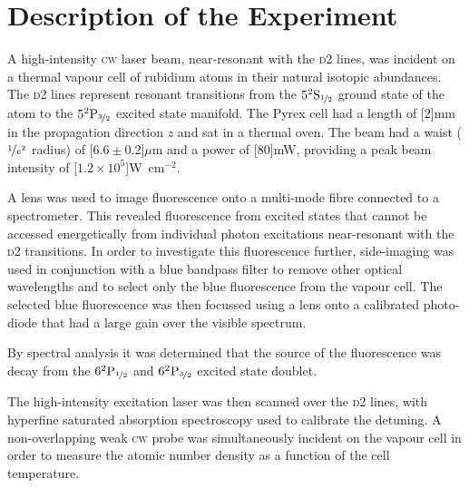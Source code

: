 \section{Description of the Experiment}
  \label{sec:twophoton_experiment}

    A high-intensity \textsc{cw} laser beam, near-resonant with the \textsc{d2}
    lines, was incident on a thermal vapour cell of rubidium atoms in their
    natural isotopic abundances. The \textsc{d2} lines represent resonant
    transitions from the $5^2\rm{S}_{\nicefrac{1}{2}}$ ground state of the
    atom to the $5^2\rm{P}_{\nicefrac{3}{2}}$ excited state manifold. The
    Pyrex cell had a length of \unit[$2$]{mm} in the propagation direction $z$
    and sat in a thermal oven. The beam had a waist (\ie $\nicefrac{1}{e^2}$
    radius) of \unit[$6.6\pm0.2$]{$\mu$m} and a power of \unit[$80$]{mW},
    providing a peak beam intensity of 
    \unit[$1.2\times10^5$]{W~cm$^{-2}$}.\cite{Weller2013}

    A lens was used to image fluorescence onto a multi-mode fibre connected to a
    spectrometer. This revealed fluorescence from excited states that cannot be
    accessed energetically from individual photon excitations near-resonant with
    the \textsc{d2} transitions. In order to investigate this fluorescence
    further, side-imaging was used in conjunction with a blue bandpass filter to
    remove other optical wavelengths and to select only the blue fluorescence
    from the vapour cell. The selected blue fluorescence was then focussed
    using a lens onto a calibrated photo-diode that had a large gain over the
    visible spectrum.

    By spectral analysis it was determined that the source of the fluorescence
    was decay from the $6^2\rm{P}_{\nicefrac{1}{2}}$ and
    $6^2\rm{P}_{\nicefrac{3}{2}}$ excited state doublet.

    The high-intensity excitation laser was then scanned over the \textsc{d2}
    lines, with hyperfine saturated absorption spectroscopy used to calibrate
    the detuning. A non-overlapping weak \textsc{cw} probe was simultaneously
    incident on the vapour cell in order to measure the atomic number density as
    a function of the cell temperature.


